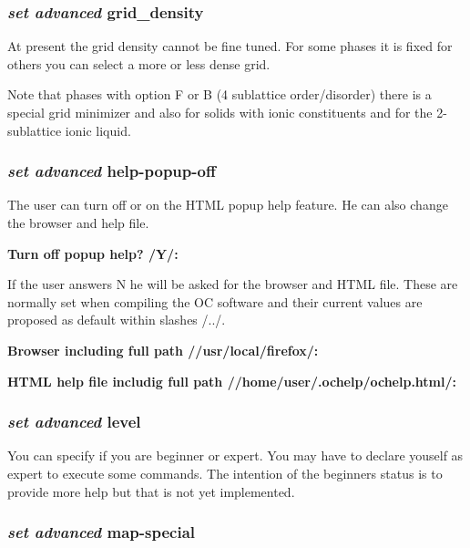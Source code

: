 \documentclass[11pt]{article}
\begin{document}
\subsubsection{{\em set advanced} grid\_density}

At present the grid density cannot be fine tuned.  For some phases it
is fixed for others you can select a more or less dense grid.

Note that phases with option F or B (4 sublattice order/disorder)
there is a special grid minimizer and also for solids with ionic
constituents and for the 2-sublattice ionic liquid.

\hypertarget{Set adv help popup}{}
\subsubsection{{\em set advanced} help-popup-off}\label{sc:help-popup}

The user can turn off or on the HTML popup help feature.  He can also
change the browser and help file.

{\bf Turn off popup help? /Y/:}

If the user answers N he will be asked for the browser and HTML file.
These are normally set when compiling the OC software and their
current values are proposed as default within slashes /../.

{\bf Browser including full path //usr/local/firefox/:}

{\bf HTML help file includig full path //home/user/.ochelp/ochelp.html/:}

\hypertarget{Set adv level}{}
\subsubsection{{\em set advanced} level}

You can specify if you are beginner or expert.  You may have to
declare youself as expert to execute some commands.  The intention of
the beginners status is to provide more help but that is not yet
implemented.

\subsubsection{{\em set advanced} map-special}
\end{document}
